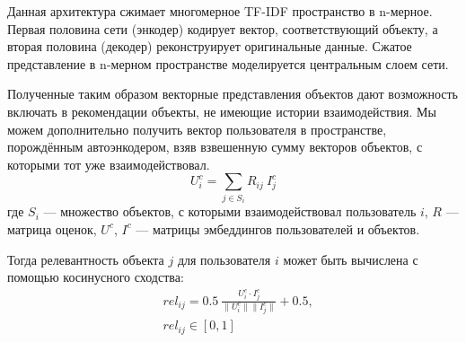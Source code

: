 \begin{figure}[h!]
\caption{}
\label{fig:autoencoder}
\end{figure}

Данная архитектура сжимает многомерное TF-IDF пространство в n-мерное.
Первая половина сети (энкодер) кодирует вектор, соответствующий объекту, а вторая половина (декодер) реконструирует оригинальные данные.
Сжатое представление в n-мерном пространстве моделируется центральным слоем сети.

Полученные таким образом векторные представления объектов дают возможность включать в рекомендации объекты, не имеющие истории взаимодействия.
Мы можем дополнительно получить вектор пользователя в пространстве, порождённым автоэнкодером, взяв взвешенную сумму векторов объектов, с которыми тот уже взаимодействовал.
\begin{equation}\label{eq:content-user-emb}
        U_{i}^{c} = \sum_{j \in S_i}{R_{ij}~I_{j}^{c}}
\end{equation}
где $S_i$ --- множество объектов, с которыми взаимодействовал пользователь $i$,
$R$ --- матрица оценок,
$U^c$, $I^c$ --- матрицы эмбеддингов пользователей и объектов.

Тогда релевантность объекта $j$ для пользователя $i$ может быть вычислена с помощью косинусного сходства:
\begin{equation}\label{eq:content-user-rel}
    \begin{aligned}
        & rel_{ij} = 0.5~\frac{U_{i}^{c} \cdot I_{j}^{c}}{\| U_{i}^{c} \| \| I_{j}^{c} \|} + 0.5, \\
        & rel_{ij} \in [0, 1]
    \end{aligned}
\end{equation}

